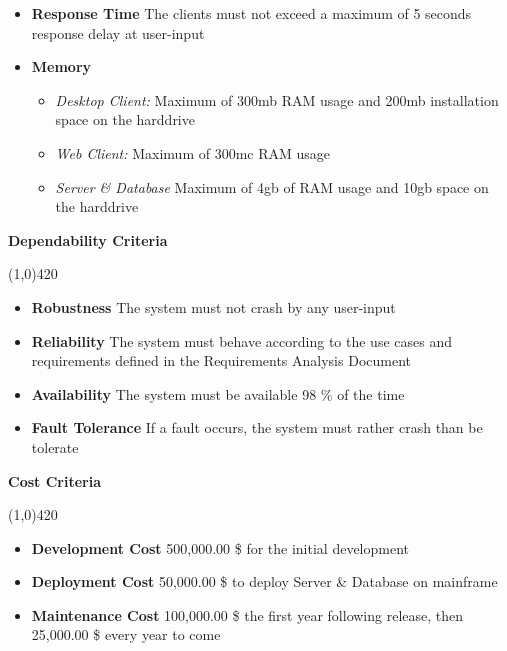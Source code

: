 \begin{itemize}
\item \textbf{Response Time} The clients must not exceed a maximum of 5 seconds response delay at user-input
\item \textbf{Memory} 
\begin{itemize}
\item \emph{Desktop Client:} Maximum of 300mb RAM usage and 200mb installation space on the harddrive
\item \emph{Web Client:} Maximum of 300mc RAM usage
\item \emph{Server \& Database} Maximum of 4gb of RAM usage and 10gb space on the harddrive
\end{itemize}
\end{itemize}

\vspace{0.5cm}

\textbf{Dependability Criteria}
\vspace{-1.1cm}
\begin{center}
\line(1,0){420}
\end{center}
\begin{itemize}
\item \textbf{Robustness} The system must not crash by any user-input
\item \textbf{Reliability} The system must behave according to the use cases and requirements defined in the Requirements Analysis Document
\item \textbf{Availability} The system must be available 98 \% of the time
\item \textbf{Fault Tolerance} If a fault occurs, the system must rather crash than be tolerate
\end{itemize}



\textbf{Cost Criteria}
\vspace{-1.1cm}
\begin{center}
\line(1,0){420}
\end{center}
\begin{itemize}
\item \textbf{Development Cost}  500,000.00 \$ for the initial development
\item \textbf{Deployment Cost}  50,000.00 \$ to deploy Server \& Database on mainframe
\item \textbf{Maintenance Cost}  100,000.00 \$ the first year following release, then 25,000.00 \$ every year to come
\end{itemize}

